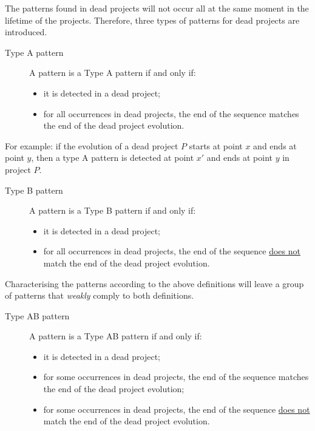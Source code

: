 The patterns found in dead projects will not occur all at the same moment in
the lifetime of the projects. Therefore, three types of patterns for dead
projects are introduced.

\vspace{1em}
\label{def:pattern_typea}
\begin{description}
	\item[Type A pattern]
		A pattern is a Type A pattern if and only if:
		\begin{itemize}
			\item it is detected in a dead project;
			\item for all occurrences in dead projects, the end of the sequence matches
				the end of the dead project evolution.
		\end{itemize}
\end{description}

\vspace{1em}
\noindent
For example: if the evolution of a dead project $P$ starts at point $x$ and ends
at point $y$, then a type A pattern is detected at point $x'$ and ends at point
$y$ in project $P$.

\vspace{1em}
\label{def:pattern_typeb}
\begin{description}
	\item[Type B pattern]
		A pattern is a Type B pattern if and only if:
		\begin{itemize}
			\item it is detected in a dead project;
			\item for all occurrences in dead projects, the end of the sequence
				\underline{does not} match the end of the dead project evolution.
		\end{itemize}
\end{description}

\vspace{1em}
\noindent
Characterising the patterns according to the above definitions will leave a
group of patterns that \textit{weakly} comply to both definitions.

\vspace{1em}
\label{def:pattern_typeab}
\begin{description}
	\item[Type AB pattern]
		A pattern is a Type AB pattern if and only if:
		\begin{itemize}
			\item it is detected in a dead project;
			\item for some occurrences in dead projects, the end of the sequence matches
				the end of the dead project evolution;
			\item for some occurrences in dead projects, the end of the sequence
				\underline{does not} match the end of the dead project evolution.
		\end{itemize}
\end{description}

